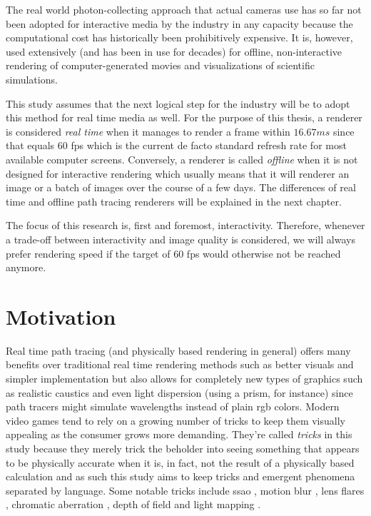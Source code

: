 \documentclass[
  twoside,
  11pt, a4paper,
  footinclude=true,
  headinclude=true,
  cleardoublepage=empty
]{scrreprt}
\begin{document}
The real world photon-collecting approach that actual cameras use has so far not been adopted for
interactive media by the industry in any capacity because the computational cost has historically
been prohibitively expensive. It is, however, used extensively (and has been in use for decades)
for offline, non-interactive rendering of computer-generated movies and visualizations of
scientific simulations.

This study assumes that the next logical step for the industry will be to adopt this method for
real time media as well. For the purpose of this thesis, a renderer is considered
\textit{real time} when it manages to render a frame within \(16.67ms\) since that equals 60
\ac{fps} which is
the current de facto standard refresh rate for most available computer screens. Conversely, a
renderer is called \textit{offline} when it is not designed for interactive rendering which usually
means that it will renderer an image or a batch of images over the course of a few days. The
differences of real time and offline path tracing renderers will be explained in the next chapter.

The focus of this research is, first and foremost, interactivity. Therefore, whenever a trade-off between
interactivity and image quality is considered, we will always prefer rendering speed if the target
of 60 \ac{fps} would otherwise not be reached anymore.

\section{Motivation}
Real time path tracing (and physically based rendering in general) offers many
benefits over traditional real time rendering methods such as better visuals
and simpler implementation but also allows for completely new types of graphics
such as realistic caustics \cite{wiki:caustics} and even light dispersion
\cite{wiki:dispersion} (using a prism, for instance) since path tracers might simulate wavelengths
instead of plain \ac{rgb} colors. Modern video games tend
to rely on a growing number of tricks to keep them visually appealing as the
consumer grows more demanding. They're called \textit{tricks} in this study
because they merely trick the beholder into seeing something that appears to be
physically accurate when it is, in fact, not the result of a physically based
calculation and as such this study aims to keep tricks and emergent phenomena
separated by language. Some notable tricks include \ac{ssao}
\cite{wiki:ssao}, motion blur \cite{wiki:motion-blur}, lens flares
\cite{wiki:lens-flare}, chromatic aberration \cite{wiki:chromatic-aberration},
depth of field \cite{wiki:depth-of-field} and light mapping \cite{wiki:lightmap}.
\end{document}
